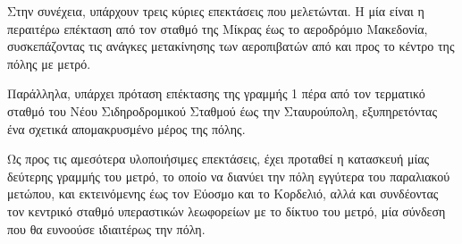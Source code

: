 Στην συνέχεια, υπάρχουν τρεις κύριες επεκτάσεις που μελετώνται. Η μία είναι η περαιτέρω επέκταση από τον σταθμό της Μίκρας έως το αεροδρόμιο Μακεδονία, συσκεπάζοντας τις ανάγκες μετακίνησης των αεροπιβατών από και προς το κέντρο της πόλης με μετρό.

Παράλληλα, υπάρχει πρόταση επέκτασης της γραμμής 1 πέρα από τον τερματικό σταθμό του Νέου Σιδηροδρομικού Σταθμού έως την Σταυρούπολη, εξυπηρετόντας ένα σχετικά απομακρυσμένο μέρος της πόλης.

Ως προς τις αμεσότερα υλοποιήσιμες επεκτάσεις, έχει προταθεί η κατασκευή μίας δεύτερης γραμμής του μετρό, το οποίο να διανύει την πόλη εγγύτερα του παραλιακού μετώπου, και εκτεινόμενης έως τον Εύοσμο και το Κορδελιό, αλλά και συνδέοντας τον κεντρικό σταθμό υπεραστικών λεωφορείων με το δίκτυο του μετρό, μία σύνδεση που θα ευνοούσε ιδιαιτέρως την πόλη.

